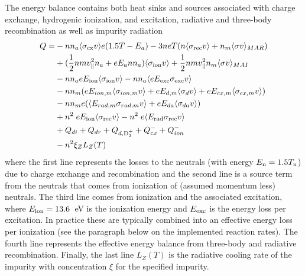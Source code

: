 \documentclass[amsmath,amssymb,a4]{revtex4-2}
\begin{document}
The energy balance contains both heat sinks and sources associated with charge exchange, hydrogenic ionization, and excitation, radiative and three-body recombination as well as impurity radiation
\begin{equation}\label{energy_source}
\begin{split}
    Q = &-n n_a \langle\sigma_{\rm cx} v\rangle e (1.5T - E_{a})  - 3 neT (n\langle\sigma_{\rm rec} v\rangle + n_m\langle\sigma v \rangle_{MAR}) \\
        &+ (\frac{1}{2} n m v^2_\parallel n_a +e E_a n n_a) \langle\sigma_{\rm ion} v\rangle +\frac{1}{2} n m v_{\|}^2 n_m\langle\sigma v\rangle_{MAI}\\
        &- n n_a eE_{\rm ion} \langle \sigma_{\rm ion} v\rangle - n n_a \langle eE_{\rm exc} \sigma_{\rm exc} v\rangle \\
        &-nn_m(eE_{ion,m}\langle \sigma_{ion,m} v\rangle + eE_{d,m} \langle \sigma_{d}v\rangle+eE_{cx,m}\langle \sigma_{cx,m}v\rangle) \\
        &-nn_me(\langle E_{rad,m}\sigma_{rad,m}v\rangle+eE_{da} \langle \sigma_{da}v\rangle) \\
        &+ n^2 \;eE_{\rm ion} \langle \sigma_{\rm rec} v\rangle - n^2 \;e\langle E_{\rm rad} \sigma_{\rm rec} v\rangle \\
        &+ Q_{di}+Q_{dr}+Q_{d,\mathrm{D_2^+}} + Q_{cx}^- + Q_{ion}^- \\
        &- n^2 \xi_Z L_Z(T)
\end{split}
\end{equation}
where the first line represents the losses to the neutrals (with energy $E_{\rm n}=1.5T_{\rm n}$) due to charge exchange and recombination and the second line is a source term from the neutrals that comes from ionization of (assumed momentum less) neutrals. The third line comes from ionization and the associated excitation, where $E_{\rm ion} = 13.6$~eV is the ionization energy and $E_{\rm exc}$ is the energy loss per excitation. In practice these are typically combined into an effective energy loss per ionization (see the paragraph below on the implemented reaction rates). The fourth line represents the effective energy balance from three-body and radiative recombination. Finally, the last line $L_Z(T)$ is the radiative cooling rate of the impurity with concentration $\xi$ for the specified impurity.
\end{document}
